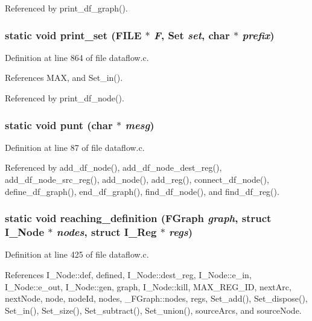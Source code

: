 Referenced by print\_\-df\_\-graph().
\subsubsection{\setlength{\rightskip}{0pt plus 5cm}static void print\_\-set (FILE $\ast$ {\em F}, \bf{Set} {\em set}, char $\ast$ {\em prefix})\hspace{0.3cm}{\tt  [static]}}\label{dataflow_8c_5ca1dc1f1faecf9c5f34638963e72377}




Definition at line 864 of file dataflow.c.

References MAX, and Set\_\-in().

Referenced by print\_\-df\_\-node().
\subsubsection{\setlength{\rightskip}{0pt plus 5cm}static void punt (char $\ast$ {\em mesg})\hspace{0.3cm}{\tt  [static]}}\label{dataflow_8c_f0931678875804718c6d3459d6628485}




Definition at line 87 of file dataflow.c.

Referenced by add\_\-df\_\-node(), add\_\-df\_\-node\_\-dest\_\-reg(), add\_\-df\_\-node\_\-src\_\-reg(), add\_\-node(), add\_\-reg(), connect\_\-df\_\-node(), define\_\-df\_\-graph(), end\_\-df\_\-graph(), find\_\-df\_\-node(), and find\_\-df\_\-reg().
\subsubsection{\setlength{\rightskip}{0pt plus 5cm}static void reaching\_\-definition (\bf{FGraph} {\em graph}, struct \bf{I\_\-Node} $\ast$ {\em nodes}, struct \bf{I\_\-Reg} $\ast$ {\em regs})\hspace{0.3cm}{\tt  [static]}}\label{dataflow_8c_cd4ebc26b673b66a06053423aedae318}




Definition at line 425 of file dataflow.c.

References I\_\-Node::def, defined, I\_\-Node::dest\_\-reg, I\_\-Node::e\_\-in, I\_\-Node::e\_\-out, I\_\-Node::gen, graph, I\_\-Node::kill, MAX\_\-REG\_\-ID, next\-Arc, next\-Node, node, node\-Id, nodes, \_\-FGraph::nodes, regs, Set\_\-add(), Set\_\-dispose(), Set\_\-in(), Set\_\-size(), Set\_\-subtract(), Set\_\-union(), source\-Arcs, and source\-Node.

